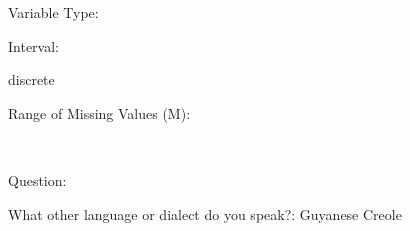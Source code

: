 \documentclass[
]{article}
\begin{document}
\begin{minipage}[t]{0.3\linewidth}

Variable Type:

\end{minipage}%
\begin{minipage}[t]{0.7\linewidth}

\end{minipage}

\begin{minipage}[t]{0.3\linewidth}

Interval:

\end{minipage}%
\begin{minipage}[t]{0.7\linewidth}

discrete

\end{minipage}

\begin{minipage}[t]{0.3\linewidth}

Range of Missing Values (M):

\end{minipage}%
\begin{minipage}[t]{0.7\linewidth}

~

\end{minipage}

\begin{minipage}[t]{0.3\linewidth}

Question:

\end{minipage}%
\begin{minipage}[t]{0.7\linewidth}

What other language or dialect do you speak?: Guyanese Creole

\end{minipage}
\end{document}
